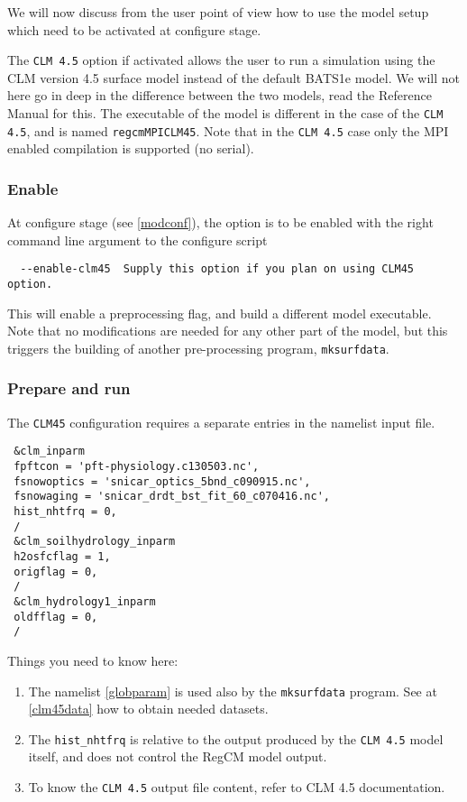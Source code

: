 We will now discuss from the user point of view how to use the model
setup which need to be activated at configure stage.

The \verb=CLM 4.5= option if activated allows the user to run a simulation using
the CLM version 4.5 surface model instead of the default BATS1e model.
We will not here go in deep in the difference between the two models, read
the Reference Manual for this.
The executable of the model is different in the case of the \verb=CLM 4.5=,
and is named \verb=regcmMPICLM45=.
Note that in the \verb=CLM 4.5= case only the MPI enabled compilation is
supported (no serial).

\subsubsection{Enable}

At configure stage (see \ref{modconf}), the option is to be enabled with the
right command line argument to the configure script

\begin{Verbatim}
  --enable-clm45  Supply this option if you plan on using CLM45 option.
\end{Verbatim}

This will enable a preprocessing flag, and build a different model executable.
Note that no modifications are needed for any other part of the model, but
this triggers the building of another pre-processing program, \verb=mksurfdata=.

\subsubsection{Prepare and run}
\label{clm45run}

The \verb=CLM45= configuration requires a separate entries in the namelist input
file.

{\footnotesize
\begin{Verbatim}
 &clm_inparm
 fpftcon = 'pft-physiology.c130503.nc',
 fsnowoptics = 'snicar_optics_5bnd_c090915.nc',
 fsnowaging = 'snicar_drdt_bst_fit_60_c070416.nc',
 hist_nhtfrq = 0,
 /
 &clm_soilhydrology_inparm
 h2osfcflag = 1,
 origflag = 0,
 /
 &clm_hydrology1_inparm
 oldfflag = 0,
 /
\end{Verbatim}
}

Things you need to know here:

\begin{enumerate}
\item The namelist \ref{globparam} is used also by the \verb=mksurfdata=
program. See at \ref{clm45data} how to obtain needed datasets.
\item The \verb=hist_nhtfrq= is relative to the output produced by the
\verb=CLM 4.5= model itself, and does not control the RegCM model output.
\item To know the \verb=CLM 4.5= output file content, refer to CLM 4.5
documentation.
\end{enumerate}

